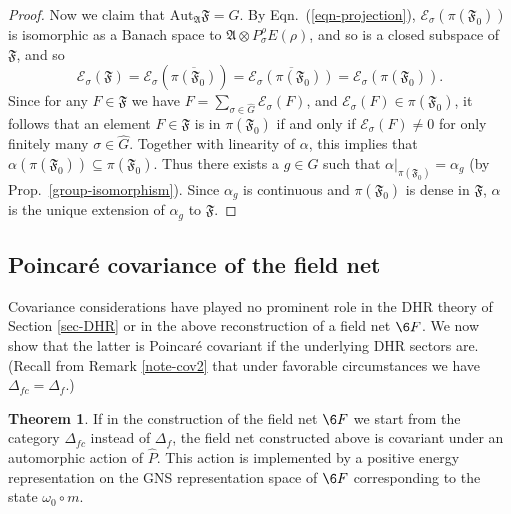 \documentclass[11pt]{article}
\newcommand{\alg}[1]{\mathfrak{#1}}
\theoremstyle{definition}
\newtheorem{thm}{Theorem}[section]
\theoremstyle{definition}
\theoremstyle{remark}
\def\4#1{{\mathscr #1}}
\def\a{\alpha} \def\b{\beta} \def\g{\gamma} \def\d{\delta}
\newcommand{\Aut}{\mathrm{Aut}}
\begin{document}
\begin{proof}
Now we claim that $\Aut _{\alg{A}}\alg{F}=G$.  By Eqn.\
(\ref{eqn-projection}), $\4E _\sigma (\pi (\alg{F}_0))$
is isomorphic as a Banach space to $\alg{A}\otimes
P_{\sigma}^{\rho}E(\rho )$, and so is a closed subspace
of $\alg{F}$, and so
$$ \4E _\sigma (\alg{F})=\4E _\sigma (\overline{\pi (\alg{F}_0)})=\overline{\4E
  _{\sigma}(\pi (\alg{F}_0))}= \4E _\sigma (\pi (\alg{F}_0)) .$$ Since for any $F\in
\alg{F}$ we have $F=\sum _{\sigma \in \hat{G}}\4E _\sigma (F)$, and $\4E _\sigma
(F)\in \pi (\alg{F}_0)$, it follows that an element $F\in \alg{F}$ is in $\pi
(\alg{F}_0)$ if and only if $\4E _{\sigma}(F)\neq 0$ for only finitely many $\sigma
\in \hat{G}$.  Together with linearity of $\a$, this implies that $\a (\pi
(\alg{F}_0))\subseteq \pi (\alg{F}_0)$.  Thus there exists a $g\in G$ such that $\a
|_{\pi (\alg{F}_0)}=\a _g$ (by Prop.\ \ref{group-isomorphism}).  Since $\a _g$ is
continuous and $\pi (\alg{F}_0)$ is dense in $\alg{F}$, $\a$ is the unique extension
of $\a _g$ to $\alg{F}$.
\end{proof}


\subsection{Poincar\'e covariance of the field net}
Covariance considerations have played no prominent role
in the DHR theory of Section \ref{sec-DHR} or in the
above reconstruction of a field net $\6F$. We now show
that the latter is Poincar\'e covariant if the
underlying DHR sectors are. (Recall from Remark
\ref{note-cov2} that under favorable circumstances we
have $\Delta_{fc}=\Delta_f$.)

\begin{thm} If in the construction of the field net $\6F$ we start from the category $\Delta_{fc}$
instead of $\Delta_f$, the field net constructed above is covariant under an automorphic action of
$\widehat{P}$. This action is implemented by a positive energy representation on the GNS
representation space of $\6F$ corresponding to the state $\omega_0\circ m$.  
\end{thm}
\end{document}
